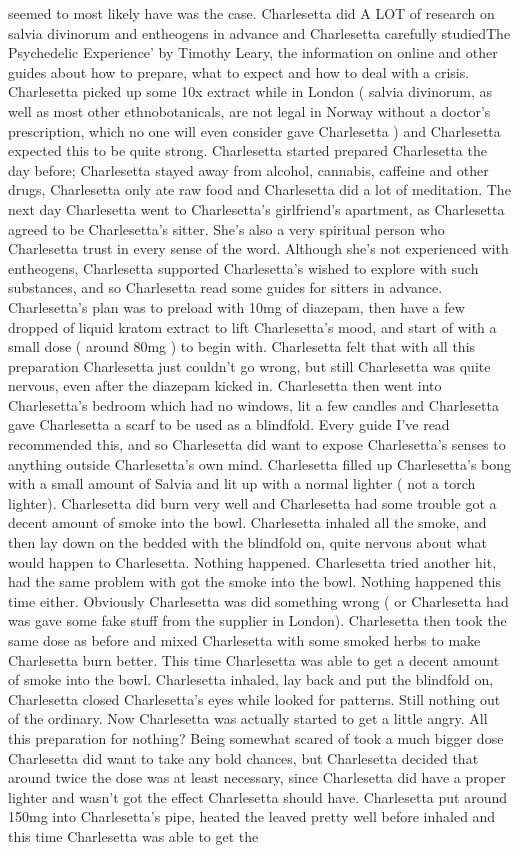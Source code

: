 \documentclass[12pt]{book}
\begin{document}
seemed to most likely have was the case. Charlesetta did A LOT of research on salvia divinorum and entheogens in advance and Charlesetta carefully studiedThe Psychedelic Experience' by Timothy Leary, the information on online and other guides about how to prepare, what to expect and how to deal with a crisis. Charlesetta picked up some 10x extract while in London ( salvia divinorum, as well as most other ethnobotanicals, are not legal in Norway without a doctor's prescription, which no one will even consider gave Charlesetta ) and Charlesetta expected this to be quite strong. Charlesetta started prepared Charlesetta the day before; Charlesetta stayed away from alcohol, cannabis, caffeine and other drugs, Charlesetta only ate raw food and Charlesetta did a lot of meditation. The next day Charlesetta went to Charlesetta's girlfriend's apartment, as Charlesetta agreed to be Charlesetta's sitter. She's also a very spiritual person who Charlesetta trust in every sense of the word. Although she's not experienced with entheogens, Charlesetta supported Charlesetta's wished to explore with such substances, and so Charlesetta read some guides for sitters in advance. Charlesetta's plan was to preload with 10mg of diazepam, then have a few dropped of liquid kratom extract to lift Charlesetta's mood, and start of with a small dose ( around 80mg ) to begin with. Charlesetta felt that with all this preparation Charlesetta just couldn't go wrong, but still Charlesetta was quite nervous, even after the diazepam kicked in. Charlesetta then went into Charlesetta's bedroom which had no windows, lit a few candles and Charlesetta gave Charlesetta a scarf to be used as a blindfold. Every guide I've read recommended this, and so Charlesetta did want to expose Charlesetta's senses to anything outside Charlesetta's own mind. Charlesetta filled up Charlesetta's bong with a small amount of Salvia and lit up with a normal lighter ( not a torch lighter). Charlesetta did burn very well and Charlesetta had some trouble got a decent amount of smoke into the bowl. Charlesetta inhaled all the smoke, and then lay down on the bedded with the blindfold on, quite nervous about what would happen to Charlesetta. Nothing happened. Charlesetta tried another hit, had the same problem with got the smoke into the bowl. Nothing happened this time either. Obviously Charlesetta was did something wrong ( or Charlesetta had was gave some fake stuff from the supplier in London). Charlesetta then took the same dose as before and mixed Charlesetta with some smoked herbs to make Charlesetta burn better. This time Charlesetta was able to get a decent amount of smoke into the bowl. Charlesetta inhaled, lay back and put the blindfold on, Charlesetta closed Charlesetta's eyes while looked for patterns. Still nothing out of the ordinary. Now Charlesetta was actually started to get a little angry. All this preparation for nothing? Being somewhat scared of took a much bigger dose Charlesetta did want to take any bold chances, but Charlesetta decided that around twice the dose was at least necessary, since Charlesetta did have a proper lighter and wasn't got the effect Charlesetta should have. Charlesetta put around 150mg into Charlesetta's pipe, heated the leaved pretty well before inhaled and this time Charlesetta was able to get the 
\end{document}
